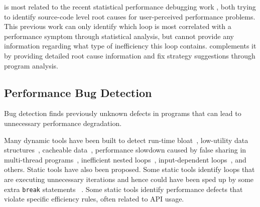 \Tool is most related to
the recent statistical performance debugging work
\citep{SongOOPSLA2014}, both trying to identify source-code level root causes
for user-perceived performance problems. 
This previous work can only identify which loop is most correlated with 
a performance symptom through statistical analysis, 
but cannot provide any information
regarding what type of inefficiency this loop contains.
\Tool complements it by
providing detailed root cause information and fix strategy suggestions through
program analysis. 

\subsection{Performance Bug Detection}

Bug detection finds previously unknown defects in programs that can
lead to unnecessary performance degradation. 

Many dynamic tools have been built to detect
run-time bloat~\cite{Dufour:2008:STC:1453101.1453111, Xu:2009:GFP:1542476.1542523, Xu:2010:DIC:1806596.1806616}, 
low-utility data structures~\cite{Xu:2010:FLD:1806596.1806617}, 
cacheable data~\cite{Cachetor}, performance slowdown caused by false sharing in
multi-thread programs~\cite{Liu:2011:SPD:2048066.2048070},
inefficient nested loops~\cite{Alabama},
input-dependent loops~\cite{xiao13:context}, and others. 
Static tools have also been proposed. Some static tools identify loops 
that are executing 
unnecessary iterations and hence could have been sped up by some extra
\texttt{break} statements
~\cite{CARAMEL,IsilDillig.PLDI15}. 
Some static tools \cite{PerfBug} identify performance defects that violate
specific efficiency rules, often related to API usage. 

